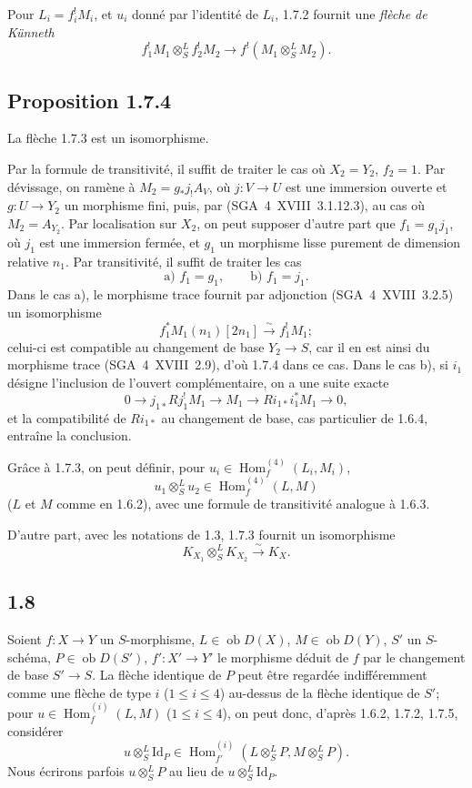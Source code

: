 \documentclass[11pt]{article}
\DeclareMathOperator{\Hom}{Hom}
\newcommand{\ob}{\operatorname{ob}}
\providecommand{\Id}{\mathrm{Id}}
\providecommand{\Hom}{\operatorname{Hom}}
\providecommand{\ob}{\operatorname{ob}}
\providecommand{\Hom}{\operatorname{Hom}}
\begin{document}
Pour $L_i=f_i^{!}M_i$, et $u_i$ donné par l'identité de $L_i$, 1.7.2 fournit une \emph{flèche de Künneth}
\begin{equation}\tag{1.7.3}
f_1^{!}M_1\otimes^{L}_{S}f_2^{!}M_2\longrightarrow f^{!}(M_1\otimes^{L}_{S}M_2).
\end{equation}

\subsection*{Proposition 1.7.4}
La flèche 1.7.3 est un isomorphisme.

Par la formule de transitivité, il suffit de traiter le cas où $X_2=Y_2$, $f_2=1$. Par dévissage, on ramène à $M_2=g_{*}j_{!}A_V$, où $j:V\to U$ est une immersion ouverte et $g:U\to Y_2$ un morphisme fini, puis, par (SGA~4~XVIII~3.1.12.3), au cas où $M_2=A_{Y_2}$. Par localisation sur $X_2$, on peut supposer d'autre part que $f_1=g_1j_1$, où $j_1$ est une immersion fermée, et $g_1$ un morphisme lisse purement de dimension relative $n_1$. Par transitivité, il suffit de traiter les cas
\[
\text{a) } f_1=g_1,\qquad \text{b) } f_1=j_1.
\]
Dans le cas a), le morphisme trace fournit par adjonction (SGA~4~XVIII~3.2.5) un isomorphisme
\[
f_1^{*}M_1(n_1)[2n_1]\xrightarrow{\sim}f_1^{!}M_1;
\]
celui-ci est compatible au changement de base $Y_2\to S$, car il en est ainsi du morphisme trace (SGA~4~XVIII~2.9), d'où 1.7.4 dans ce cas. Dans le cas b), si $i_1$ désigne l'inclusion de l'ouvert complémentaire, on a une suite exacte
\[
0\longrightarrow j_{1*}Rj_1^{!}M_1\longrightarrow M_1\longrightarrow Ri_{1*}i_1^{*}M_1\longrightarrow0,
\]
et la compatibilité de $Ri_{1*}$ au changement de base, cas particulier de 1.6.4, entraîne la conclusion.

Grâce à 1.7.3, on peut définir, pour $u_i\in\Hom_f^{(4)}(L_i,M_i)$,
\begin{equation}\tag{1.7.5}
u_1\otimes^{L}_{S}u_2\in\Hom_f^{(4)}(L,M)
\end{equation}
($L$ et $M$ comme en 1.6.2), avec une formule de transitivité analogue à 1.6.3.

D'autre part, avec les notations de 1.3, 1.7.3 fournit un isomorphisme
\begin{equation}\tag{1.7.6}
K_{X_1}\otimes^{L}_{S}K_{X_2}\xrightarrow{\sim}K_X.
\end{equation}

\subsection*{1.8}
Soient $f:X\to Y$ un $S$-morphisme, $L\in\ob D(X)$, $M\in\ob D(Y)$, $S'$ un $S$-schéma, $P\in\ob D(S')$, $f':X'\to Y'$ le morphisme déduit de $f$ par le changement de base $S'\to S$. La flèche identique de $P$ peut être regardée indifféremment comme une flèche de type $i$ ($1\leq i\leq4$) au-dessus de la flèche identique de $S'$; pour $u\in\Hom_f^{(i)}(L,M)$ ($1\leq i\leq4$), on peut donc, d'après 1.6.2, 1.7.2, 1.7.5, considérer
\begin{equation}\tag{1.8.1}
u\otimes^{L}_{S}\Id_P\in\Hom_{f'}^{(i)}(L\otimes^{L}_{S}P,M\otimes^{L}_{S}P).
\end{equation}
Nous écrirons parfois $u\otimes^{L}_{S}P$ au lieu de $u\otimes^{L}_{S}\Id_P$.
\end{document}
